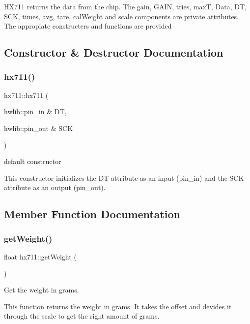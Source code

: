 H\+X711 returns the data from the chip. The gain, G\+A\+IN, tries, maxT, Data, DT, S\+CK, times, avg, tare, cal\+Weight and scale components are private attributes. The appropiate constructers and functions are provided 

\subsection{Constructor \& Destructor Documentation}
\mbox{\label{classhx711_a6665f2fb7a4d9e98662c24ede7c5ddab}} 
\subsubsection{\texorpdfstring{hx711()}{hx711()}}
{\footnotesize\ttfamily hx711\+::hx711 (\begin{DoxyParamCaption}\item[{hwlib\+::pin\+\_\+in \&}]{DT,  }\item[{hwlib\+::pin\+\_\+out \&}]{S\+CK }\end{DoxyParamCaption})}



default constructor 

This constructor initializes the DT attribute as an input (pin\+\_\+in) and the S\+CK attribute as an output (pin\+\_\+out). 

\subsection{Member Function Documentation}
\mbox{\label{classhx711_ab48ca212b0d0afb494e3f2fcbefa3985}} 
\subsubsection{\texorpdfstring{get\+Weight()}{getWeight()}}
{\footnotesize\ttfamily float hx711\+::get\+Weight (\begin{DoxyParamCaption}{ }\end{DoxyParamCaption})\hspace{0.3cm}{\ttfamily [virtual]}}



Get the weight in grams. 

This function returns the weight in grams. It takes the offset and devides it through the scale to get the right amount of grams. \mbox{\label{classhx711_a2adbffceb80c1db7f8af74258df7c2fc}} 
